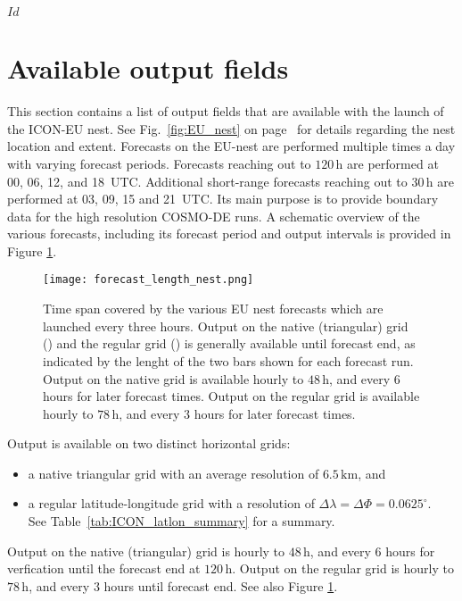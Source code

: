 \svnInfo $Id$


\section{Available output fields}\label{nest:sec_outfields}

This section contains a list of output fields that are available with
the launch of the ICON-EU nest. See Fig.~\ref{fig:EU_nest} on page~\pageref{fig:EU_nest} 
for details regarding the nest location and extent.
%
Forecasts on the EU-nest are performed multiple times a day with varying forecast periods. Forecasts reaching out to $120\,\mathrm{h}$ 
are performed at 00, 06, 12, and 18~UTC. Additional short-range forecasts reaching out to $30\,\mathrm{h}$ are performed at 03, 09, 15 and 21~UTC. 
Its main purpose is to provide boundary data for the high resolution COSMO-DE runs. A schematic overview of the various forecasts, including its 
forecast period and output intervals is provided in Figure \ref{fig:forecast_length_nest}.
\begin{figure}[hbt]
 \centering
 \texttt{[image: forecast\_length\_nest.png]}
 \caption{Time span covered by the various EU nest forecasts which are launched every three hours.
          Output on the native (triangular) grid (\protect\markRed) and the regular grid (\protect\markBlue) 
          is generally available until forecast end, as indicated by the lenght of the two bars shown for 
          each forecast run. Output on the native grid is available hourly to $48\,\mathrm{h}$, and 
          every $6$ hours for later forecast times. Output on the regular grid is available hourly to 
          $78\,\mathrm{h}$, and every $3$ hours for later forecast times.
          }\label{fig:forecast_length_nest}
\end{figure}

Output is available on two distinct horizontal grids: 
\begin{itemize}
  \item a native triangular grid with an average resolution of $6.5\,\mathrm{km}$, and
  \item a regular latitude-longitude grid with a resolution of $\Delta \lambda = \Delta \Phi=0.0625^{\circ}$.\\
    See Table~\ref{tab:ICON_latlon_summary} for a summary.
\end{itemize}
%
Output on the native (triangular) grid is hourly to $48\,\mathrm{h}$, and every $6$ hours for verfication
until the forecast end at $120\,\mathrm{h}$.
Output on the regular grid is hourly to $78\,\mathrm{h}$, and every $3$ hours
until forecast end. See also Figure \ref{fig:forecast_length_nest}.

